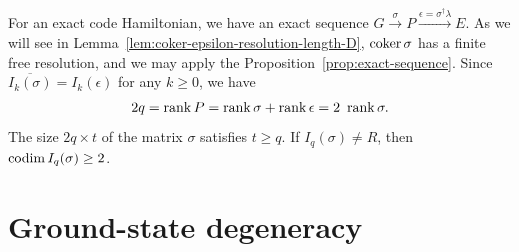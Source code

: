 \begin{rem}
For an exact code Hamiltonian,
we have an exact sequence $G \xrightarrow{\sigma} P \xrightarrow{\epsilon=\sigma^\dagger \lambda} E$.
As we will see in Lemma~\ref{lem:coker-epsilon-resolution-length-D},
$\mathop{\mathrm{coker}}\nolimits \sigma$ has a finite free resolution,
and we may apply the Proposition~\ref{prop:exact-sequence}.
Since $\overline{ I_k(\sigma) } = I_k(\epsilon)$ for any $k \ge 0$, we have
\[
 2q = \mathop{\mathrm{rank}}\nolimits P = \mathop{\mathrm{rank}}\nolimits \sigma + \mathop{\mathrm{rank}}\nolimits \epsilon = 2~ \mathop{\mathrm{rank}}\nolimits \sigma.
\]
The size $2q \times t$ of the matrix $\sigma$ satisfies $t \ge q$.
If $I_q(\sigma) \ne R$, then $\mathop{\mathrm{codim}}\nolimits I_q(\sigma) \ge 2$.
\label{rem:rank-sigma-m}
\end{rem}

\section{Ground-state degeneracy}
\label{sec:degeneracy}

